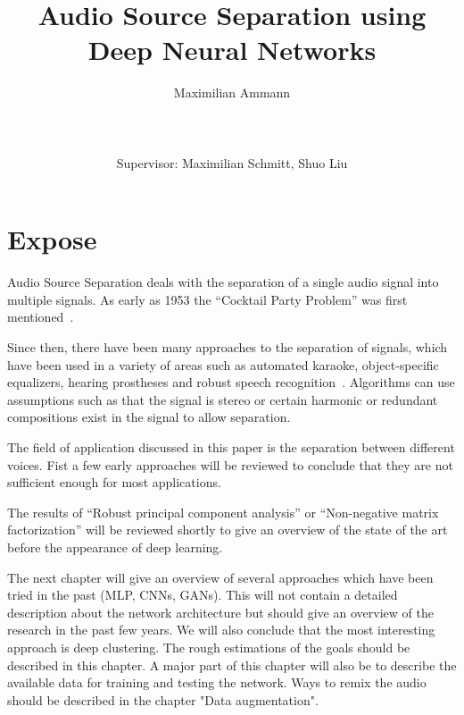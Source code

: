 \documentclass{include/2.5/sig-alternate}
\begin{document}
\crdata{}

\title{Audio Source Separation using Deep Neural Networks}

\author{
	\alignauthor
	Maximilian Ammann\\
	\\
	\\
	\\
	Supervisor: Maximilian Schmitt, Shuo Liu\\
}
\maketitle

\section{Expose}\label{sec:intro}
Audio Source Separation deals with the separation of a single audio signal into multiple signals.
As early as 1953 the \enquote{Cocktail Party Problem} was first mentioned~\cite{Cherry1953}.

Since then, there have been many approaches to the separation of signals, which have been used in a variety of areas such as automated karaoke, object-specific equalizers, hearing prostheses and robust speech recognition~\cite{Wang2018}.
Algorithms can use assumptions such as that the signal is stereo or certain harmonic or redundant compositions exist in the signal to allow separation.

The field of application discussed in this paper is the separation between different voices.
Fist a few early approaches will be reviewed to conclude that they are not sufficient enough for most applications.

The results of \enquote{Robust principal component analysis} or \enquote{Non-negative matrix factorization} will be reviewed shortly to give an overview of the state of the art before the appearance of deep learning.

The next chapter will give an overview of several approaches which have been tried in the past (MLP, CNNs, GANs). This will not contain a detailed description about the network architecture but should give an overview of the research in the past few years.
We will also conclude that the most interesting approach is deep clustering. The rough estimations of the goals should be described in this chapter.
A major part of this chapter will also be to describe the available data for training and testing the network. Ways to remix the audio should be described in the chapter "Data augmentation".
\end{document}
